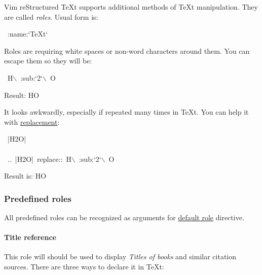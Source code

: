 \documentclass[12pt]{article}
\newcommand{\subs}[1]{\raisebox{-0.7ex}{\footnotesize #1}}
\begin{document}
Vim reStructured \TeX{}t supports additional methods of \TeX{}t manipulation. They are called
\emph{roles}. Usual form is:

\begin{ttfamily}\begin{flushleft}
\mbox{~:name:`\TeX{}t`}\\
\end{flushleft}\end{ttfamily}

Roles are requiring white spaces or non-word characters around them. You
can escape them so they will be:

\begin{ttfamily}\begin{flushleft}
\mbox{~H$\backslash$~:sub:`2`$\backslash$~O}\\
\end{flushleft}\end{ttfamily}

Result: H\subs{2}O

It looks awkwardly, especially if repeated many times in \TeX{}t. You can
help it with \href{\#lreplacement}{replacement}:

\begin{ttfamily}\begin{flushleft}
\mbox{~|H2O|}\\
\mbox{}\\
\mbox{~..~|H2O|~replace::~H$\backslash$~:sub:`2`$\backslash$~O}\\
\end{flushleft}\end{ttfamily}

Result is: H\subs{2}O

\hypertarget{lpredefined-roles}{}
\subsubsection{Predefined roles}

All predefined roles can be recognized as arguments for \href{\#ldefault-role}{default role}
directive.

\hypertarget{ltitle-reference}{}
\paragraph{Title reference}

This role will should be used to display \emph{Titles of books} and similar
citation sources. There are three ways to declare it in \TeX{}t:
\end{document}
